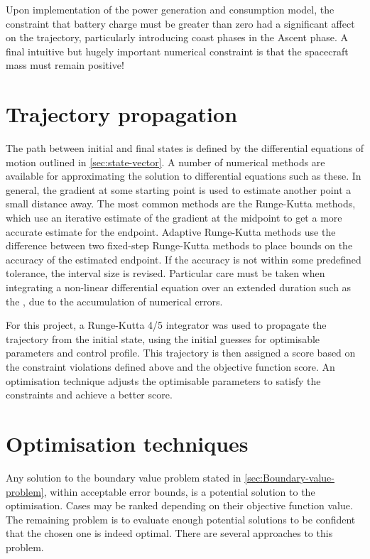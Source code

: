 Upon implementation of the power generation and consumption model, the constraint that battery charge must be greater than zero had a significant affect on the trajectory, particularly introducing coast phases in the Ascent phase. A final intuitive but hugely important numerical constraint is that the spacecraft mass must remain positive! 

\section{Trajectory propagation}
The path between initial and final states is defined by the differential equations of motion outlined in \autoref{sec:state-vector}. A number of numerical methods are available for approximating the solution to differential equations such as these. In general, the gradient at some starting point is used to estimate another point a small distance away. The most common methods are the Runge-Kutta methods, which use an iterative estimate of the gradient at the midpoint to get a more accurate estimate for the endpoint. Adaptive Runge-Kutta methods use the difference between two fixed-step Runge-Kutta methods to place bounds on the accuracy of the estimated endpoint. If the accuracy is not within some predefined tolerance, the interval size is revised. Particular care must be taken when integrating a non-linear differential equation over an extended duration such as the \BW, due to the accumulation of numerical errors.

For this project, a Runge-Kutta 4/5 integrator was used to propagate the trajectory from the initial state, using the initial guesses for optimisable parameters and control profile. This trajectory is then assigned a score based on the constraint violations defined above and the objective function score. An optimisation technique adjusts the optimisable parameters to satisfy the constraints and achieve a better score.

\section{Optimisation techniques}\label{sec:Techniques}

Any solution to the boundary value problem stated in \autoref{sec:Boundary-value-problem}, within acceptable error bounds, is a potential solution to the optimisation. Cases may be ranked depending on their objective function value. The remaining problem is to evaluate enough potential solutions to be confident that the chosen one is indeed optimal. There are several approaches to this problem.

